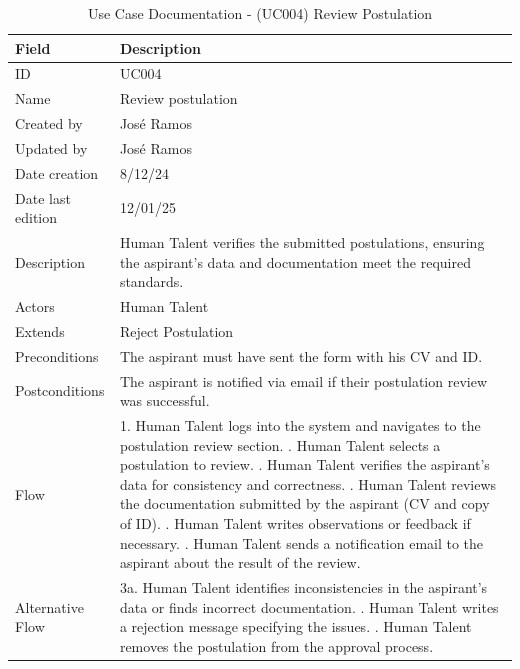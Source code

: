 \documentclass{scrreprt}
\begin{document}
\begin{table}[H]
	\centering
	\begin{tabular}{|p{3cm}|p{10cm}|}
		\hline
		\textbf{Field} & \textbf{Description} \\ \hline
		ID & UC004 \\ \hline
		Name & Review postulation \\ \hline
		Created by & José Ramos \\ \hline
		Updated by & José Ramos \\ \hline
		Date creation & 8/12/24 \\ \hline
		Date last edition & 12/01/25 \\ \hline
		Description & Human Talent verifies the submitted postulations, ensuring the aspirant’s data and documentation meet the required standards. \\ \hline
		Actors & Human Talent \\ \hline
		Extends & Reject Postulation \\ \hline
		Preconditions & The aspirant must have sent the form with his CV and ID. \\ \hline
		Postconditions & The aspirant is notified via email if their postulation review was successful. \\ \hline
		Flow & 
		1. Human Talent logs into the system and navigates to the postulation review section. \newline
		2. Human Talent selects a postulation to review. \newline
		3. Human Talent verifies the aspirant’s data for consistency and correctness. \newline
		4. Human Talent reviews the documentation submitted by the aspirant (CV and copy of ID). \newline
		5. Human Talent writes observations or feedback if necessary. \newline
		6. Human Talent sends a notification email to the aspirant about the result of the review. 
		\\ \hline
		Alternative Flow &  
		3a. Human Talent identifies inconsistencies in the aspirant’s data or finds incorrect documentation. \newline
		4. Human Talent writes a rejection message specifying the issues. \newline
		5. Human Talent removes the postulation from the approval process.
		\\ \hline
	\end{tabular}
	\caption{Use Case Documentation - (UC004) Review Postulation}
	\label{table:UC004}
\end{table}
\end{document}
